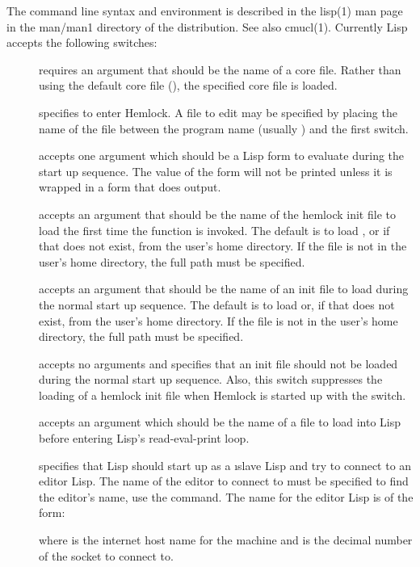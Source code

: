 The command line syntax and environment is described in the lisp(1) man page in
the man/man1 directory of the distribution.  See also cmucl(1).
Currently Lisp accepts the following switches:
\begin{description}

\item[] requires an argument that should be the name of a
core file.  Rather than using the default core file
(), the specified core file is
loaded.

\item[] specifies to enter Hemlock.  A file to edit may be
specified by placing the name of the file between the program name
(usually ) and the first switch.

\item[]
accepts one argument which should be a Lisp form to evaluate during
the start up sequence.  The value of the form will not be printed unless it is
wrapped in a form that does output.

\item[]
accepts an argument that should be the name of
the hemlock init file to load the first time the function
 is invoked.  The default is to load
, or if that does not
exist,  from the user's home directory.  If
the file is not in the user's home directory, the full path must be
specified.

\item[] accepts an argument that should be the name of an
init file to load during the normal start up sequence.  The default is
to load  or, if that does not exist,
 from the user's home directory.  If the file is not in
the user's home directory, the full path must be specified.

\item[]
accepts no arguments and specifies that an init file should not
be loaded during the normal start up sequence.  Also, this switch
suppresses the loading of a hemlock init file when Hemlock is started up
with the  switch.

\item[]
accepts an argument which should be the name of a file to load
into Lisp before entering Lisp's read-eval-print loop.

\item[] specifies that Lisp should start up as a \i{slave}
Lisp and try to connect to an editor Lisp.  The name of the editor to
connect to must be specified \dash{} to find the editor's name, use the
\hemlock{}  command.  The name for
the editor Lisp is of the form:
\begin{example}
\code{:}
\end{example}
where  is the internet host name for the machine and
 is the decimal number of the socket to connect to.
\end{description}
